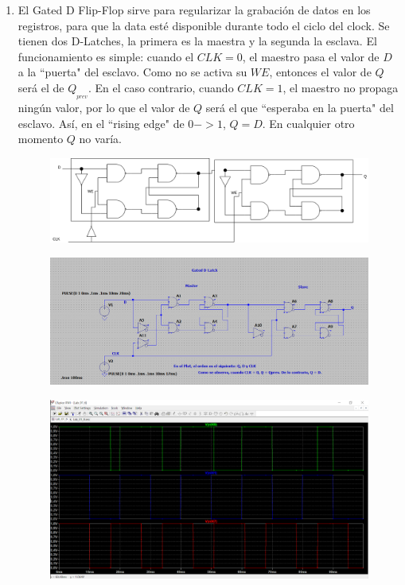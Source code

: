 \documentclass[11pt,a4paper]{article}
\begin{document}
\begin{enumerate}
\begin{itemize}
\end{itemize}
\item El Gated D Flip-Flop sirve para regularizar la grabación de datos en los registros, para que la data esté disponible durante todo el ciclo del clock.
Se tienen dos D-Latches, la primera es la maestra y la segunda la esclava. El funcionamiento es simple: cuando el $CLK = 0$, el maestro pasa el valor de $D$ a la ``puerta" del esclavo. Como no se activa su $WE$, entonces el valor de $Q$ será el de $Q_{_{prev}}$.
En el caso contrario, cuando $CLK=1$, el maestro no propaga ningún valor, por lo que el valor de $Q$ será el que ``esperaba en la puerta" del esclavo.
Así, en el ``rising edge" de $0->1$, $Q=D$. En cualquier otro momento $Q$ no varía.
\begin{figure}[h]
\centering
\includegraphics[scale=0.35]{9.png} 
\end{figure}
\begin{figure}[h]
\centering
\includegraphics[scale=0.25]{dia6.png} 
\end{figure}
\begin{figure}[h]
\centering
\includegraphics[scale=0.2]{plot6.png} 
\end{figure}
\end{enumerate}
\end{document}
